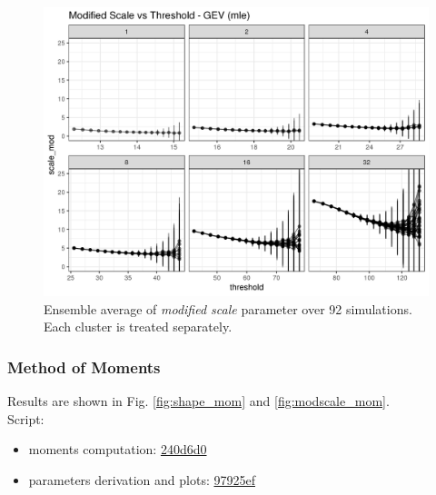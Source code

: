 \documentclass{article}
\begin{document}
\begin{figure}
	\includegraphics[width=\linewidth]{fig/modscale_gev_mle_RK401_1e7_maxt05_1e7.png}
	\caption{Ensemble average of \textit{modified scale} parameter over 92 simulations. Each cluster is treated separately.}
	\label{fig:modscale_mle}
\end{figure}

\subsubsection{Method of Moments}
Results are shown in Fig. \ref{fig:shape_mom} and \ref{fig:modscale_mom}.
\\Script:
\begin{itemize}
	\item moments computation: \href{https://github.com/marco-cucchi/L96gev/commit/240d6d0471ddc3fc53789e43e03a87013d032b86#diff-9576f7ab149830e9a08339b0fc9f2569}{240d6d0}
	\item parameters derivation and plots: \href{https://github.com/marco-cucchi/L96gev/commit/97925ef80db61ade1851bb7c41948d7f13f3b91f#diff-503bcadc356f924b6a536c1b0796b054}{97925ef}
\end{itemize}
\end{document}
